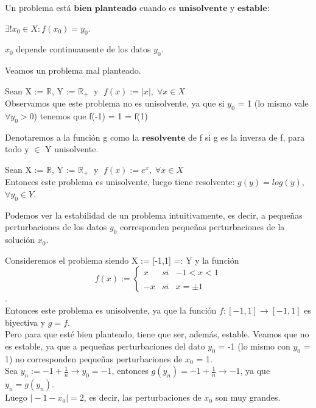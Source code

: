 \begin{ndef}
Un problema está $\textbf{bien planteado}$ cuando es $\textbf{unisolvente}$ y $\textbf{estable}$:
	\begin{nlist}
	\item $\exists ! x_0 \in X : f(x_0) = y_0$.
	\item $x_0$ depende continuamente de los datos $y_0$.
	\end{nlist}
\end{ndef}

\begin{ejemplo}
Veamos un problema mal planteado.

Sean X := $\mathbb{R}$, Y := $\mathbb{R}_+ \;$ y $\; f(x) := \vert x \vert , \; \forall x \in X$\\
Observamos que este problema no es unisolvente, ya que si $y_0$ = 1 (lo mismo vale $\forall y_0 > 0$) tenemos que f(-1) = 1 = f(1)
\end{ejemplo}

\begin{ndef}[Resolvente]
Denotaremos a la función g como la $\textbf{resolvente}$ de f si g es la inversa de f, para todo y $\in$ Y unisolvente.
\end{ndef}

\begin{ejemplo}
Sean X := $\mathbb{R}$, Y := $\mathbb{R}_+ \;$ y $\; f(x) := e^x , \; \forall x \in X$\\
Entonces este problema es unisolvente, luego tiene resolvente: $g(y) = log(y)$, $\forall y_0 \in Y$.
\end{ejemplo}

Podemos ver la estabilidad de un problema intuitivamente, es decir, a pequeñas perturbaciones de los datos $y_0$ corresponden pequeñas perturbaciones de la solución $x_0$.

\begin{ejemplo}
Consideremos el problema siendo X := [-1,1] =: Y y la función
$$
f(x) := \left\{ \begin{array}{lcc}
x & si & -1 < x < 1 \\
\\ -x & si & x = \pm 1
\end{array}
\right.
$$.\\
Entonces este problema es unisolvente, ya que la función $f :  [-1,1] \rightarrow [-1,1]$ es biyectiva y $g = f$.\\
Pero para que esté bien planteado, tiene que ser, además, estable. Veamos que no es estable, ya que a pequeñas perturbaciones del dato $y_0$ = -1 (lo mismo con $y_0$ = 1) no corresponden pequeñas perturbaciones de $x_0$ = 1.\\
Sea $y_n := -1 + \frac{1}{n} \rightarrow y_0 = -1$, entonces $g(y_n) = -1 + \frac{1}{n} \rightarrow -1$, ya que $y_n = g(y_n)$.\\
Luego $\vert -1 - x_0 \vert = 2$, es decir, las perturbaciones de $x_0$ son muy grandes.
\end{ejemplo}

